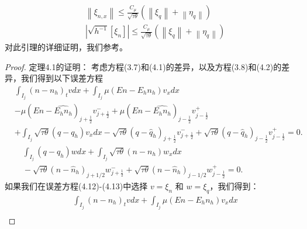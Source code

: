 \begin{lemma}
    \begin{align}
         & \left\|\xi_{n, x}\right\| \leq \frac{C_{\mu}}{\sqrt{\tau \theta}}\left(\left\|\xi_{q}\right\|+\left\|\eta_{q}\right\|\right)                      \\
         & \left|\sqrt{h^{-1}}\left[\xi_{n}\right]\right| \leq \frac{C_{\mu}}{\sqrt{\tau \theta}}\left(\left\|\xi_{q}\right\|+\left\|\eta_{q}\right\|\right)
    \end{align}
    对此引理的详细证明，我们参考\parencite{wang2015stability}。
\end{lemma}
\begin{proof}
    定理4.1的证明： 考虑方程(3.7)和(4.1)的差异，以及方程(3.8)和(4.2)的差异，我们得到以下误差方程
    \begin{align}
         & \int_{I_{j}}\left(n-n_{h}\right)_{t} v d x+\int_{I_{j}} \mu\left(E n-E_{h} n_{h}\right) v_{x} d x                                                                                                                                       \nonumber \\
         & -\mu\left(E n-\widehat{E_{h} n_{h}}\right)_{j+\frac{1}{2}} v_{j+\frac{1}{2}}^{-}+\mu\left(E n-\widehat{E_{h} n_{h}}\right)_{j-\frac{1}{2}} v_{j-\frac{1}{2}}^{+}                                                                        \nonumber \\
         & +\int_{I_{j}} \sqrt{\tau \theta}\left(q-q_{h}\right) v_{x} d x-\sqrt{\tau \theta}\left(q-\hat{q}_{h}\right)_{j+\frac{1}{2}} v_{j+\frac{1}{2}}^{-}+\sqrt{\tau \theta}\left(q-\hat{q}_{h}\right)_{j-\frac{1}{2}} v_{j-\frac{1}{2}}^{+}=0 .          \\
         & \quad \int_{I_{j}}\left(q-q_{h}\right) w d x+\int_{I_{j}} \sqrt{\tau \theta}\left(n-n_{h}\right) w_{x} d x                                                                                                                              \nonumber \\
         & \quad-\sqrt{\tau \theta}\left(n-\hat{n}_{h}\right)_{j+1 / 2} w_{j+\frac{1}{2}}^{-}+\sqrt{\tau \theta}\left(n-\hat{n}_{h}\right)_{j-1 / 2} w_{j-\frac{1}{2}}^{+}=0 .
    \end{align}
    如果我们在误差方程(4.12)-(4.13)中选择 $v=\xi_{n}$ 和 $w=\xi_{q}$，我们得到：
    \begin{equation}
        \begin{aligned}
             & \int_{I_{j}}\left(n-n_{h}\right)_{t} v d x+\int_{I_{j}} \mu\left(E n-E_{h} n_{h}\right) v_{x} d x                                                                                                                                        \\

\end{aligned}
\end{equation}
\end{proof}
